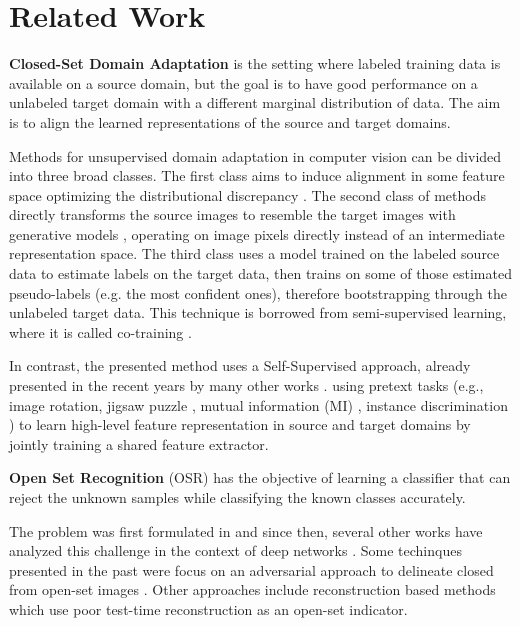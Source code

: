 \documentclass[10pt,twocolumn,letterpaper]{article}
\begin{document}
\section{Related Work}
\label{sec:relatedwork}
\textbf{Closed-Set Domain Adaptation} is the setting where labeled training data is 
available on a source domain, but the goal is to have good performance on a 
unlabeled target domain with a different marginal distribution
of data. The aim is to align the learned representations of the source and target domains.

Methods for unsupervised domain adaptation in computer vision can be divided into 
three broad classes. The first class aims to induce alignment in some feature space optimizing the distributional discrepancy \cite{bousmalis2016domain,long2015learning,ganin2015unsupervised,hoffman2017cycada}.
The second class of methods directly transforms the source images to resemble 
the target images with generative models \cite{taigman2016unsupervised,tzeng2017adversarial,bousmalis2017unsupervised}, 
operating on image pixels directly instead of an intermediate 
representation space.
The third class uses a model trained on the labeled source data to 
estimate labels on the target data, then trains on some of those estimated 
pseudo-labels (e.g. the most confident ones), therefore bootstrapping through the 
unlabeled target data. This technique is borrowed from semi-supervised learning, 
where it is called co-training \cite{saito2017asymmetric,zou2018domain,chen2017rethinking}.

In contrast, the presented method uses a Self-Supervised approach, already presented in 
the recent years by many other works \cite{sun2019unsupervised,saito2020universal,yue2021prototypical}.
using pretext tasks (e.g., image rotation, jigsaw puzzle \cite{CarlucciJigsaw}, mutual information (MI) \cite{selfsupfeng}, instance discrimination \cite{chen2020simple}) to learn high-level feature representation in 
source and target domains by jointly training a shared feature extractor.

\textbf{Open Set Recognition} (OSR) has the objective of learning a classifier 
that can reject the unknown samples while classifying the known classes accurately.

The problem was first formulated in \cite{firstPaperOSR} and since then, several other works have analyzed this challenge in the context 
of deep networks \cite{perera2019deep, hein2019relu, bendale2015open}.
Some techinques presented in the past were focus on an adversarial approach to 
delineate closed from open-set images \cite{ge2017generative, kong2021opengan}.
Other approaches include reconstruction based methods 
\cite{yoshihashi2019classificationreconstruction}
which use poor test-time reconstruction as an open-set indicator.
\end{document}
